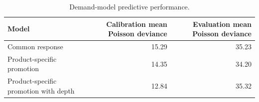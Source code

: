\begin{table}
\centering
\caption{Demand-model predictive performance.}
\label{tab:demand_model_performance}
\begin{tabular}{lrr}
\toprule
Model & Calibration mean Poisson deviance & Evaluation mean Poisson deviance \\
\midrule
Common response & 15.29 & 35.23 \\
Product-specific promotion & 14.35 & 34.20 \\
Product-specific promotion with depth & 12.84 & 35.32 \\
\bottomrule
\end{tabular}
\end{table}
